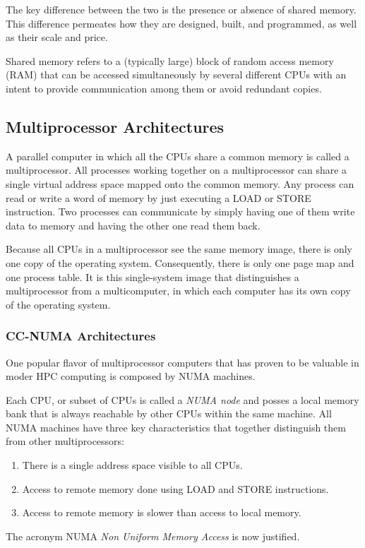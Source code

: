 \documentclass[a4paper,12pt]{article}
\begin{document}
The key difference between the two is the presence or absence of shared memory.
This difference permeates how they are designed, built, and programmed, as well as their scale and price\cite[p.586]{Tanenbaum}.

Shared memory refers to a (typically large) block of random access memory (RAM) that can be accessed simultaneously by several different CPUs with an intent to provide communication among them or avoid redundant copies.


\subsection{Multiprocessor Architectures}\label{sec:multiprocessor}
A parallel computer in which all the CPUs share a common memory is called a multiprocessor. 
All processes working together on a multiprocessor can share a single virtual address space mapped onto the common memory. 
Any process can read or write a word of memory by just executing a LOAD or STORE instruction.
Two processes can communicate by simply having one of them write data to memory and having the other one read them back.

Because all CPUs in a multiprocessor see the same memory image, there is only one copy of the operating system. 
Consequently, there is only one page map and one process table. 
It is this single-system image that distinguishes a multiprocessor from a multicomputer, in which each computer has its own copy of the operating system.

\subsubsection{CC-NUMA Architectures}
One popular flavor of multiprocessor computers that has proven to be valuable in moder HPC computing is composed by NUMA machines.

Each CPU, or subset of CPUs is called a \textit{NUMA node} and posses a local memory bank that is always reachable by other CPUs within the same machine.
All NUMA machines have three key characteristics that together distinguish
them from other multiprocessors:
\begin{enumerate}
	\item There is a single address space visible to all CPUs.
	\item Access to remote memory done using LOAD and STORE instructions.
	\item Access to remote memory is slower than access to local memory.
\end{enumerate}
The acronym NUMA \textit{Non Uniform Memory Access} is now justified.
\end{document}
